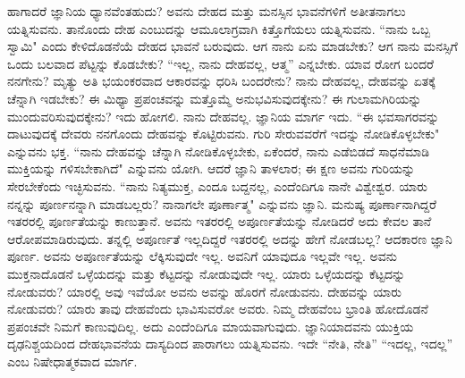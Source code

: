 ಹಾಗಾದರೆ ಜ್ಞಾನಿಯ ಧ್ಯಾನವೆಂತಹುದು? ಅವನು ದೇಹದ ಮತ್ತು ಮನಸ್ಸಿನ ಭಾವನೆಗಳಿಗೆ ಅತೀತನಾಗಲು ಯತ್ನಿಸುವನು. ತಾನೊಂದು ದೇಹ ಎಂಬುದನ್ನು ಆಮೂಲಾಗ್ರವಾಗಿ ಕಿತ್ತೊಗೆಯಲು ಯತ್ನಿಸುವನು. “ನಾನು ಒಬ್ಬ ಸ್ವಾಮಿ" ಎಂದು ಕೇಳಿದೊಡನೆಯೆ ದೇಹದ ಭಾವನೆ ಬರುವುದು. ಆಗ ನಾನು ಏನು ಮಾಡಬೇಕು? ಆಗ ನಾನು ಮನಸ್ಸಿಗೆ ಒಂದು ಬಲವಾದ ಪೆಟ್ಟನ್ನು ಕೊಡಬೇಕು? “ಇಲ್ಲ, ನಾನು ದೇಹವಲ್ಲ, ಆತ್ಮ'' ಎನ್ನಬೇಕು. ಯಾವ ರೋಗ ಬಂದರೆ ನನಗೇನು? ಮೃತ್ಯು ಅತಿ ಭಯಂಕರವಾದ ಆಕಾರವನ್ನು ಧರಿಸಿ ಬಂದರೇನು? ನಾನು ದೇಹವಲ್ಲ, ದೇಹವನ್ನು ಏತಕ್ಕೆ ಚೆನ್ನಾಗಿ ಇಡಬೇಕು? ಈ ಮಿಥ್ಯಾ ಪ್ರಪಂಚವನ್ನು ಮತ್ತೊಮ್ಮೆ ಅನುಭವಿಸುವುದಕ್ಕೇನು? ಈ ಗುಲಾಮಗಿರಿಯನ್ನು ಮುಂದುವರಿಸುವುದಕ್ಕೇನು? ಇದು ಹೋಗಲಿ. ನಾನು ದೇಹವಲ್ಲ. ಜ್ಞಾನಿಯ ಮಾರ್ಗ ಇದು. “ಈ ಭವಸಾಗರವನ್ನು ದಾಟುವುದಕ್ಕೆ ದೇವರು ನನಗೊಂದು ದೇಹವನ್ನು ಕೊಟ್ಟಿರುವನು. ಗುರಿ ಸೇರುವವರೆಗೆ ಇದನ್ನು ನೋಡಿಕೊಳ್ಳಬೇಕು" ಎನ್ನುವನು ಭಕ್ತ. “ನಾನು ದೇಹವನ್ನು ಚೆನ್ನಾಗಿ ನೋಡಿಕೊಳ್ಳಬೇಕು, ಏಕೆಂದರೆ, ನಾನು ಎಡೆಬಿಡದೆ ಸಾಧನೆಮಾಡಿ ಮುಕ್ತಿಯನ್ನು ಗಳಿಸಬೇಕಾಗಿದೆ" ಎನ್ನುವನು ಯೋಗಿ. ಆದರೆ ಜ್ಞಾನಿ ತಾಳಲಾರ; ಈ ಕ್ಷಣ ಅವನು ಗುರಿಯನ್ನು ಸೇರಬೇಕೆಂದು ಇಚ್ಛಿಸುವನು. “ನಾನು ನಿತ್ಯಮುಕ್ತ, ಎಂದೂ ಬದ್ದನಲ್ಲ, ಎಂದೆಂದಿಗೂ ನಾನೇ ವಿಶ್ವೇಶ್ವರ. ಯಾರು ನನ್ನನ್ನು ಪೂರ್ಣನನ್ನಾಗಿ ಮಾಡಬಲ್ಲರು? ನಾನಾಗಲೇ ಪೂರ್ಣಾತ್ಮ" ಎನ್ನುವನು ಜ್ಞಾನಿ. ಮನುಷ್ಯ ಪೂರ್ಣಾನಾಗಿದ್ದರೆ ಇತರರಲ್ಲಿ ಪೂರ್ಣತೆಯನ್ನು ಕಾಣುತ್ತಾನೆ. ಅವನು ಇತರರಲ್ಲಿ ಅಪೂರ್ಣತೆಯನ್ನು ನೋಡಿದರೆ ಅದು ಕೇವಲ ತಾನೆ ಆರೋಪಮಾಡಿರುವುದು. ತನ್ನಲ್ಲಿ ಅಪೂರ್ಣತೆ ಇಲ್ಲದಿದ್ದರೆ ಇತರರಲ್ಲಿ ಅದನ್ನು ಹೇಗೆ ನೋಡಬಲ್ಲ? ಆದಕಾರಣ ಜ್ಞಾನಿ ಪೂರ್ಣ. ಅವನು ಅಪೂರ್ಣತೆಯನ್ನು ಲೆಕ್ಕಿಸುವುದೇ ಇಲ್ಲ. ಅವನಿಗೆ ಯಾವುದೂ ಇಲ್ಲವೇ ಇಲ್ಲ. ಅವನು ಮುಕ್ತನಾದೊಡನೆ ಒಳ್ಳೆಯದನ್ನು ಮತ್ತು ಕೆಟ್ಟದನ್ನು ನೋಡುವುದೇ ಇಲ್ಲ. ಯಾರು ಒಳ್ಳೆಯದನ್ನು ಕೆಟ್ಟದನ್ನು ನೋಡುವರು? ಯಾರಲ್ಲಿ ಅವು ಇವೆಯೋ ಅವನು ಅವನ್ನು ಹೊರಗೆ ನೋಡುವನು. ದೇಹವನ್ನು ಯಾರು ನೋಡುವರು? ಯಾರು ತಾವು ದೇಹವೆಂದು ಭಾವಿಸುವರೋ ಅವರು. ನಿಮ್ಮ ದೇಹವೆಂಬ ಭ್ರಾಂತಿ ಹೋದೊಡನೆ ಪ್ರಪಂಚವೇ ನಿಮಗೆ ಕಾಣುವುದಿಲ್ಲ. ಅದು ಎಂದೆಂದಿಗೂ ಮಾಯವಾಗುವುದು. ಜ್ಞಾನಿಯಾದವನು ಯುಕ್ತಿಯ ದೃಢನಿಶ್ಚಯದಿಂದ ದೇಹಭಾವನೆಯ ದಾಸ್ಯದಿಂದ ಪಾರಾಗಲು ಯತ್ನಿಸುವನು. ಇದೇ “ನೇತಿ, ನೇತಿ'' “ಇದಲ್ಲ, ಇದಲ್ಲ'' ಎಂಬ ನಿಷೇಧಾತ್ಮಕವಾದ ಮಾರ್ಗ.

